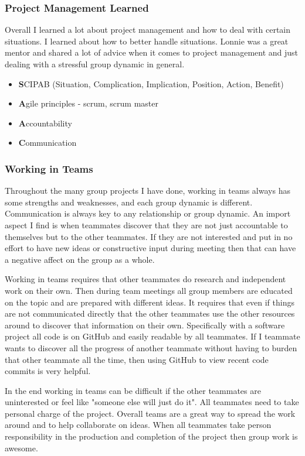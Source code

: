 \documentclass[draftclsnofoot, onecolumn, compsoc, 10pt]{IEEEtran}
\begin{document}
\subsubsection{Project Management Learned}
Overall I learned a lot about project management and how to deal with certain situations. I learned about how to better handle situations. Lonnie was a great mentor and shared a lot of advice when it comes to project management and just dealing with a stressful group dynamic in general. 
\begin{itemize}
    \item \textbf SCIPAB (Situation, Complication, Implication, Position, Action, Benefit)
    \item \textbf Agile principles - scrum, scrum master
    \item \textbf Accountability
    \item \textbf Communication
\end{itemize}

\subsubsection{Working in Teams}
Throughout the many group projects I have done, working in teams always has some strengths and weaknesses, and each group dynamic is different. Communication is always key to any relationship or group dynamic. An import aspect I find is when teammates discover that they are not just accountable to themselves but to the other teammates. If they are not interested and put in no effort to have new ideas or constructive input during meeting then that can have a negative affect on the group as a whole. 

Working in teams requires that other teammates do research and independent work on their own. Then during team meetings all group members are educated on the topic and are prepared with different ideas. It requires that even if things are not communicated directly that the other teammates use the other resources around to discover that information on their own. Specifically with a software project all code is on GitHub and easily readable by all teammates. If I teammate wants to discover all the progress of another teammate without having to burden that other teammate all the time, then using GitHub to view recent code commits is very helpful.

In the end working in teams can be difficult if the other teammates are uninterested or feel like "someone else will just do it". All teammates need to take personal charge of the project. Overall teams are a great way to spread the work around and to help collaborate on ideas. When all teammates take person responsibility in the production and completion of the project then group work is awesome.
\end{document}
